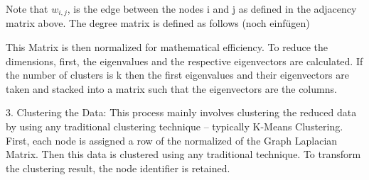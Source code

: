 Note that $w_{i,j}$, is the edge between the nodes i and j as defined in the adjacency matrix above. The degree matrix is defined as follows (noch einfügen) \newline

This Matrix is then normalized for mathematical efficiency. To reduce the dimensions, first, the eigenvalues and the respective eigenvectors are calculated. If the number of clusters is k then the first eigenvalues and their eigenvectors are taken and stacked into a matrix such that the eigenvectors are the columns. \newline

3.	Clustering the Data: This process mainly involves clustering the reduced data by using any traditional clustering technique – typically K-Means Clustering. First, each node is assigned a row of the normalized of the Graph Laplacian Matrix. Then this data is clustered using any traditional technique. To transform the clustering result, the node identifier is retained. \newline